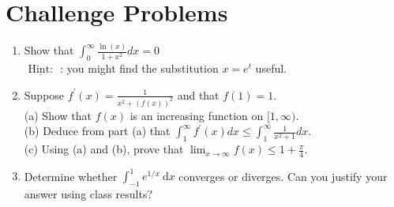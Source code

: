 \documentclass[10pt]{article}
\begin{document}
\section*{Challenge Problems}
\begin{enumerate}
  \item Show that $\int_{0}^{\infty} \frac{\ln (x)}{1+x^{2}} d x=0$\\
$\underline{\text { Hint: }}$ : you might find the substitution $x=e^{t}$ useful.
  \item Suppose $f^{\prime}(x)=\frac{1}{x^{2}+(f(x))^{2}}$ and that $f(1)=1$.\\
(a) Show that $f(x)$ is an increasing function on $[1, \infty)$.\\
(b) Deduce from part (a) that $\int_{1}^{\infty} f^{\prime}(x) d x \leq \int_{1}^{\infty} \frac{1}{x^{2}+1} d x$.\\
(c) Using (a) and (b), prove that $\lim _{x \rightarrow \infty} f(x) \leq 1+\frac{\pi}{4}$.
  \item Determine whether $\int_{-1}^{1} e^{1 / x} \mathrm{~d} x$ converges or diverges. Can you justify your answer using class results?
\end{enumerate}
\end{document}
